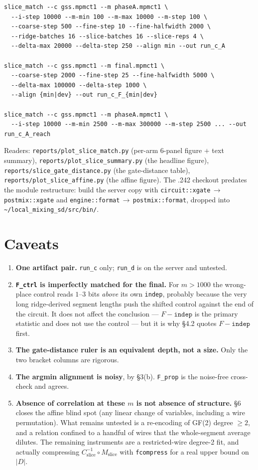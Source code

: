 \documentclass[11pt]{article}
\newcommand{\code}[1]{\texttt{#1}}
\begin{document}
\begin{small}
\begin{verbatim}
slice_match --c gss.mpmct1 --m phaseA.mpmct1 \
  --i-step 10000 --m-min 100 --m-max 10000 --m-step 100 \
  --coarse-step 500 --fine-step 10 --fine-halfwidth 2000 \
  --ridge-batches 16 --slice-batches 16 --slice-reps 4 \
  --delta-max 20000 --delta-step 250 --align min --out run_c_A

slice_match --c gss.mpmct1 --m final.mpmct1 \
  --coarse-step 2000 --fine-step 25 --fine-halfwidth 5000 \
  --delta-max 100000 --delta-step 1000 \
  --align {min|dev} --out run_c_F_{min|dev}

slice_match --c gss.mpmct1 --m phaseA.mpmct1 \
  --i-step 10000 --m-min 2500 --m-max 300000 --m-step 2500 ... --out run_c_A_reach
\end{verbatim}
\end{small}

Readers: \code{reports/plot\_slice\_match.py} (per-arm 6-panel figure $+$ text summary),
\code{reports/plot\_slice\_summary.py} (the headline figure),
\code{reports/slice\_gate\_distance.py} (the gate-distance table),
\code{reports/plot\_slice\_affine.py} (the affine figure). The .242 checkout predates the module
restructure: build the server copy with \code{circuit::xgate}\,$\to$\,\code{postmix::xgate} and
\code{engine::format}\,$\to$\,\code{postmix::format}, dropped into \code{\textasciitilde/local\_mixing\_sd/src/bin/}.

\section{Caveats}

\begin{enumerate}
\item \textbf{One artifact pair.} \code{run\_c} only; \code{run\_d} is on the server and untested.
\item \textbf{\code{F\_ctrl} is imperfectly matched for the final.} For $m>1000$ the wrong-place control
reads $1$--$3$ bits \emph{above} its own \code{indep}, probably because the very long ridge-derived
segment lengths push the shifted control against the end of the circuit. It does not affect the
conclusion --- $F-\code{indep}$ is the primary statistic and does not use the control --- but it is why
§4.2 quotes $F-\code{indep}$ first.
\item \textbf{The gate-distance ruler is an equivalent depth, not a size.} Only the two bracket columns
are rigorous.
\item \textbf{The argmin alignment is noisy}, by §3(b). \code{F\_prop} is the noise-free cross-check and
agrees.
\item \textbf{Absence of correlation at these $m$ is not absence of structure.} §6 closes the affine
blind spot (any linear change of variables, including a wire permutation). What remains untested is a
re-encoding of GF(2) degree $\ge 2$, and a relation confined to a handful of wires that the
whole-segment average dilutes. The remaining instruments are a restricted-wire degree-2 fit, and
actually compressing $C_{\mathrm{slice}}^{-1}\circ M_{\mathrm{slice}}$ with \code{fcompress} for a real
upper bound on $|D|$.
\end{enumerate}
\end{document}
